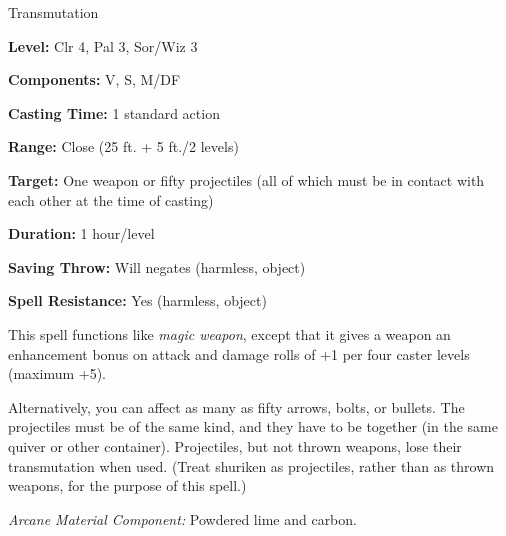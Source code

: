 \label{spell:Greater Magic Weapon}

Transmutation

\textbf{Level:} Clr 4, Pal 3, Sor/Wiz 3

\textbf{Components:} V, S, M/DF

\textbf{Casting Time:} 1 standard action

\textbf{Range:} Close (25 ft. + 5 ft./2 levels)

\textbf{Target:} One weapon or fifty projectiles (all of which must be in contact 
with each other at the time of casting)

\textbf{Duration:} 1 hour/level

\textbf{Saving Throw:} Will negates (harmless, object)

\textbf{Spell Resistance:} Yes (harmless, object)

This spell functions like \textit{magic weapon}, except that it gives a weapon 
an enhancement bonus on attack and damage rolls of +1 per four caster levels (maximum 
+5).

Alternatively, you can affect as many as fifty arrows, bolts, or bullets. The projectiles 
must be of the same kind, and they have to be together (in the same quiver or other 
container). Projectiles, but not thrown weapons, lose their transmutation when 
used. (Treat shuriken as projectiles, rather than as thrown weapons, for the purpose 
of this spell.)

\textit{Arcane Material Component:} Powdered lime and carbon.

